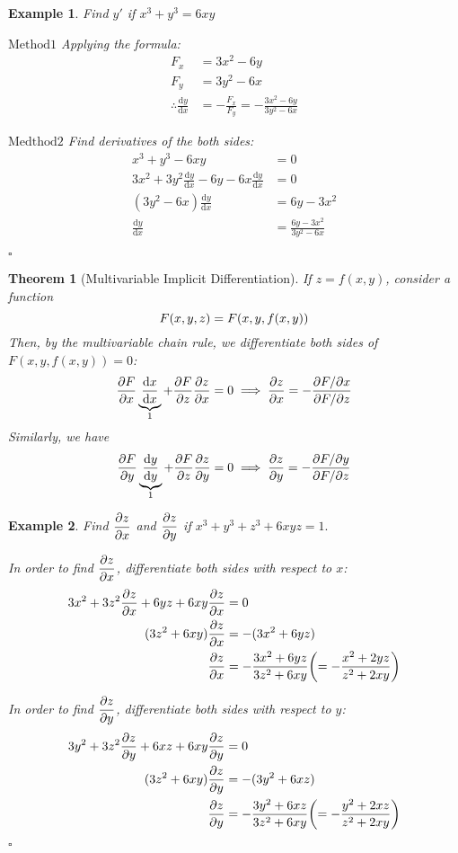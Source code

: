 \documentclass[12pt,a4paper]{article}
\newtheorem{thm}{Theorem}[subsection]
\newtheorem{eg}{Example}[subsection]
\newenvironment*{ans}{\par\indent{\textit{Answer. }}\par}{\par\hfill{$\square$}\par}
\def\d{{\mathrm{d}}}
\def\dydx{\displaystyle\frac{\d y}{\d x}}
\def\dx{\d x}
\def\del{\partial}
\begin{document}
\begin{eg}
	Find $y'$ if $x^3+y^3=6xy$
	\begin{ans}
		$\boxed{\text{Method} 1}$ Applying the formula:\[\begin{aligned}F_x&=3x^2-6y\\F_y&=3y^2-6x\\\therefore\dydx&=-\frac{F_x}{F_y}=-\frac{3x^2-6y}{3y^2-6x}\end{aligned}\]\par 
		$\boxed{\text{Medthod} 2}$ Find derivatives of the both sides: \[\begin{aligned}x^3+y^3-6xy&=0\\3x^2+3y^2\dydx-6y-6x\dydx&=0\\(3y^2-6x)\dydx&=6y-3x^2\\\dydx&=\frac{6y-3x^2}{3y^2-6x}\end{aligned}\]
	\end{ans}
\end{eg}
\begin{thm}[Multivariable Implicit Differentiation]
	If $z=f(x,y)$, consider a function \[F(x,y,z)=F\qty(x,y,f(x,y))\] Then, by the multivariable chain rule, we differentiate both sides of $F(x,y,f(x,y))=0$: \[\pdv{F}{x}\underbrace{\frac{\dx}{\dx}}_1+\pdv{F}{z}\pdv{z}{x}=0\implies\pdv{z}{x}=-\frac{\del F/\del x}{\del F/\del z}\] Similarly, we have \[\pdv{F}{y}\underbrace{\frac{\d y}{\d y}}_1+\pdv{F}{z}\pdv{z}{y}=0\implies\pdv{z}{y}=-\frac{\del F/\del y}{\del F/\del z}\]
\end{thm}
\begin{eg}
	Find $\displaystyle\pdv{z}{x}$ and $\displaystyle\pdv{z}{y}$ if $x^3+y^3+z^3+6xyz=1.$
	\begin{ans}
		In order to find $\displaystyle\pdv{z}{x}$,  differentiate both sides with respect to $x$: \[\begin{aligned}3x^2+3z^2\pdv{z}{x}+6yz+6xy\pdv{z}{x}&=0\\(3z^2+6xy)\pdv{z}{x}&=-(3x^2+6yz)\\\pdv{z}{x}&=-\frac{3x^2+6yz}{3z^2+6xy}\qty(=-\frac{x^2+2yz}{z^2+2xy})\end{aligned}\]\par
		In order to find $\displaystyle\pdv{z}{y}$,  differentiate both sides with respect to $y$: \[\begin{aligned}3y^2+3z^2\pdv{z}{y}+6xz+6xy\pdv{z}{y}&=0\\(3z^2+6xy)\pdv{z}{y}&=-(3y^2+6xz)\\\pdv{z}{y}&=-\frac{3y^2+6xz}{3z^2+6xy}\qty(=-\frac{y^2+2xz}{z^2+2xy})\end{aligned}\]
	\end{ans}
\end{eg}
\end{document}
